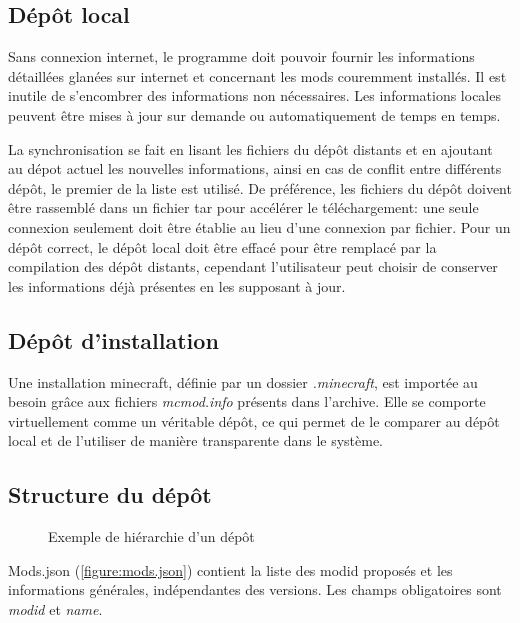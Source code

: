 \documentclass{article}
\begin{document}
\subsection{Dépôt local}
Sans connexion internet, le programme doit pouvoir fournir les informations détaillées glanées sur internet et concernant les mods couremment installés.
Il est inutile de s'encombrer des informations non nécessaires.
Les informations locales peuvent être mises à jour sur demande ou automatiquement de temps en temps.

La synchronisation se fait en lisant les fichiers du dépôt distants et en ajoutant au dépot actuel les nouvelles informations, ainsi en cas de conflit entre différents dépôt, le premier de la liste est utilisé.
De préférence, les fichiers du dépôt doivent être rassemblé dans un fichier tar pour accélérer le téléchargement: une seule connexion seulement doit être établie au lieu d'une connexion par fichier.
Pour un dépôt correct, le dépôt local doit être effacé pour être remplacé par la compilation des dépôt distants, cependant l'utilisateur peut choisir de conserver les informations déjà présentes en les supposant à jour.


\subsection{Dépôt d'installation}
\label{subsection:depot_installation}
Une installation minecraft, définie par un dossier \textit{.minecraft}, est importée au besoin grâce aux fichiers \textit{mcmod.info} présents dans l'archive.
Elle se comporte virtuellement comme un véritable dépôt, ce qui permet de le comparer au dépôt local et de l'utiliser de manière transparente dans le système.



\subsection{Structure du dépôt}
\begin{figure}
\caption{Exemple de hiérarchie d'un dépôt}
\label{fig:hierarchie}
\end{figure}

Mods.json (\ref{figure:mods.json}) contient la liste des modid proposés et les informations générales, indépendantes des versions.
Les champs obligatoires sont \textit{modid} et \textit{name}.
\end{document}
